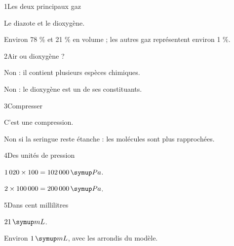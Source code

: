 \par\noindent\begin{minipage}{\linewidth}
\begin{corrige}{1}{Les deux principaux gaz}
\begin{questions}
\item Le diazote et le dioxygène.
\item Environ 78 \% et 21 \% en volume ; les autres gaz représentent environ 1 \%.
\end{questions}
\end{corrige}
\end{minipage}
\par\noindent\begin{minipage}{\linewidth}
\begin{corrige}{2}{Air ou dioxygène ?}
\begin{questions}
\item Non : il contient plusieurs espèces chimiques.
\item Non : le dioxygène est un de ses constituants.
\end{questions}
\end{corrige}
\end{minipage}
\par\noindent\begin{minipage}{\linewidth}
\begin{corrige}{3}{Compresser}
\begin{questions}
\item C’est une compression.
\item Non si la seringue reste étanche : les molécules sont plus rapprochées.
\end{questions}
\end{corrige}
\end{minipage}
\par\noindent\begin{minipage}{\linewidth}
\begin{corrige}{4}{Des unités de pression}
\begin{questions}
\item $1\,020\times100=102\,000\unite{Pa}$.
\item $2\times100\,000=200\,000\unite{Pa}$.
\end{questions}
\end{corrige}
\end{minipage}
\par\noindent\begin{minipage}{\linewidth}
\begin{corrige}{5}{Dans cent millilitres}
\begin{questions}
\item $21\unite{mL}$.
\item Environ $1\unite{mL}$, avec les arrondis du modèle.
\end{questions}
\end{corrige}
\end{minipage}
